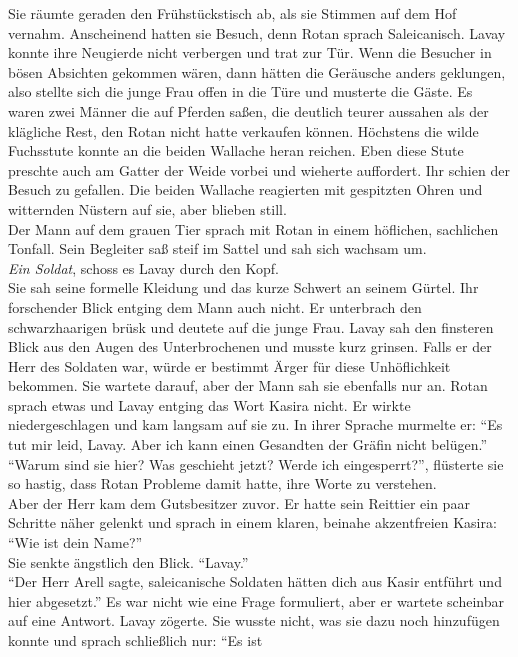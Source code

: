 Sie räumte geraden den Frühstückstisch ab, als sie Stimmen auf dem Hof vernahm. Anscheinend hatten 
sie Besuch, denn Rotan sprach Saleicanisch. Lavay konnte ihre Neugierde nicht verbergen und trat 
zur Tür. Wenn die Besucher in bösen Absichten gekommen wären, dann hätten die Geräusche anders 
geklungen, also stellte sich die junge Frau offen in die Türe und musterte die Gäste. Es waren zwei 
Männer die auf Pferden saßen, die deutlich teurer aussahen als der klägliche Rest, den Rotan nicht 
hatte verkaufen können. Höchstens die wilde Fuchsstute konnte an die beiden Wallache heran reichen. 
Eben diese Stute preschte auch am Gatter der Weide vorbei und wieherte auffordert. Ihr schien der 
Besuch zu gefallen. Die beiden Wallache reagierten mit gespitzten Ohren und witternden Nüstern auf 
sie, aber blieben still.\\
Der Mann auf dem grauen Tier sprach mit Rotan in einem höflichen, sachlichen Tonfall. Sein 
Begleiter 
saß steif im Sattel und sah sich wachsam um.\\
\textit{Ein Soldat}, schoss es Lavay durch den Kopf.\\
Sie sah seine formelle Kleidung und das kurze Schwert an seinem Gürtel. Ihr forschender Blick 
entging dem Mann auch nicht. Er unterbrach den schwarzhaarigen brüsk und deutete auf die junge 
Frau. Lavay sah den finsteren Blick aus den Augen des Unterbrochenen und musste kurz grinsen. Falls 
er der Herr des Soldaten war, würde er bestimmt Ärger für diese Unhöflichkeit bekommen. Sie wartete 
darauf, aber der Mann sah sie ebenfalls nur an. Rotan sprach etwas und Lavay entging das Wort 
Kasira 
nicht. Er wirkte niedergeschlagen und kam langsam auf sie zu. In ihrer Sprache murmelte er: ``Es 
tut mir leid, Lavay. Aber ich kann einen Gesandten der Gräfin nicht belügen.''\\
``Warum sind sie hier? Was geschieht jetzt? Werde ich eingesperrt?'', flüsterte sie so hastig, dass 
Rotan Probleme damit hatte, ihre Worte zu verstehen.\\
Aber der Herr kam dem Gutsbesitzer zuvor. Er hatte sein Reittier ein paar Schritte näher gelenkt 
und sprach in einem klaren, beinahe akzentfreien Kasira: ``Wie ist dein Name?''\\
Sie senkte ängstlich den Blick. ``Lavay.''\\
``Der Herr Arell sagte, saleicanische Soldaten hätten dich aus Kasir entführt und hier abgesetzt.''
Es war nicht wie eine Frage formuliert, aber er wartete scheinbar auf eine Antwort. Lavay zögerte. 
Sie wusste nicht, was sie dazu noch hinzufügen konnte und sprach schließlich nur: ``Es ist 

